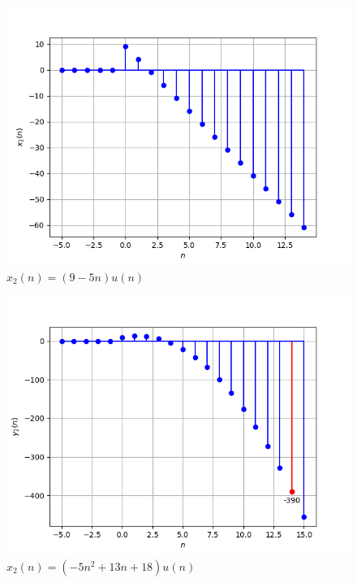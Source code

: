 \documentclass[journal,12pt,twocolumn]{IEEEtran}
\theoremstyle{remark}
\begin{document}
\begin{enumerate}
    \begin{figure}[!h] 
    \centering
    \includegraphics[width=\columnwidth]{ncert-maths/10/5/3/10/figs/signal_x2.png}
    \caption{$x_2(n)=(9-5n)u(n)$}
    \label{fig:Graph3_math.10.5.3.10}
    \end{figure}

    \begin{figure}[!h] 
    \centering
    \includegraphics[width=\columnwidth]{ncert-maths/10/5/3/10/figs/signal_y2.png}
    \caption{$x_2(n)=(-5n^2+13n+18)u(n)$}
    \label{fig:Graph4_math.10.5.3.10}
    \end{figure}

\end{enumerate} 
\end{document}
